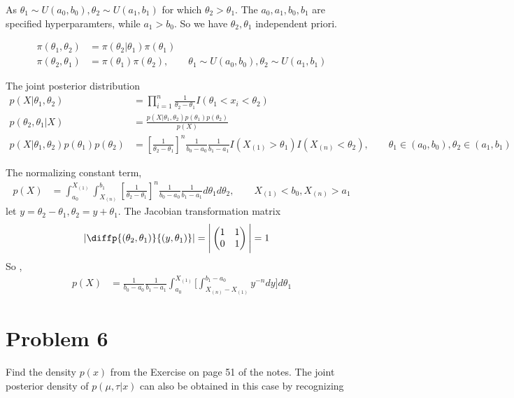 \documentclass[11pt]{article} %
\begin{document}
\begin{itemize}
As $\theta_1 \sim U(a_0, b_0), \theta_2 \sim U(a_1, b_1)$ for which $\theta_2 > \theta_1$. The $a_0, a_1, b_0, b_1$ are specified hyperparamters, while $a_1 > b_0$. So we have $\theta_2, \theta_1$ independent priori. 

\begin{align*}
	\pi(\theta_1, \theta_2) &= \pi(\theta_2|\theta_1) \pi(\theta_1) \\
	\pi(\theta_2, \theta_1) &= \pi(\theta_1) \pi(\theta_2), \qquad \theta_1 \sim U(a_0, b_0), \theta_2 \sim U(a_1, b_1)
\end{align*}	

The joint posterior distribution
\begin{align*}
	p(X|\theta_1, \theta_2) &= \prod_{i=1}^n \frac{1}{\theta_2-\theta_1} I(\theta_1 < x_i < \theta_2)\\
	p(\theta_2, \theta_1|X) &= \frac{p(X|\theta_1, \theta_2) p(\theta_1) p(\theta_2)}{p(X)}\\
	p(X|\theta_1, \theta_2) p(\theta_1) p(\theta_2) &= [\frac{1}{\theta_2-\theta_1}]^n \frac{1}{b_0-a_0} \frac{1}{b_1- a_1} I(X_{(1)} > \theta_1) I(X_{(n)} < \theta_2) , \qquad \theta_1 \in (a_0, b_0), \theta_2 \in (a_1, b_1) 
\end{align*}	

The normalizing constant term,
\begin{align*}
	p(X) &= \int_{a_0}^{X_{(1)}} \int_{X_{(n)}}^{b_1} [\frac{1}{\theta_2-\theta_1}]^n \frac{1}{b_0-a_0} \frac{1}{b_1- a_1} d\theta_1 d\theta_2  ,\qquad X_{(1)} < b_0, X_{(n)} > a_1
\end{align*}	
let $ y= \theta_2- \theta_1, \theta_2 = y+\theta_1$. The Jacobian transformation matrix
\begin{align*}
	\vert \diffp{{(\theta_2, \theta_1)}}{{(y, \theta_1)}} \vert &= \Bigg|
	\begin{pmatrix*}
		1 & 1 \\
		0 & 1
	\end{pmatrix*}
	\Bigg| = 1
\end{align*}	
So ,
\begin{align*}
	p(X) &= \frac{1}{b_0-a_0} \frac{1}{b_1- a_1} \int_{a_0}^{X_{(1)}}  \Big[\int_{X_{(n)}- X_{(1)}}^{b_1 - a_0} y^{-n}  dy \Big] d\theta_1 
\end{align*}	


\end{itemize}



\section{Problem 6}
Find the density $p(x)$ from the Exercise on page 51 of the notes. The joint posterior density of $p(\mu, \tau|x)$ can also be obtained in this case by recognizing
\end{document}

